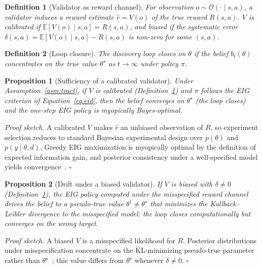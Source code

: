 \documentclass[11pt]{article}
\newtheorem{proposition}{Proposition}
\newtheorem{definition}{Definition}
\begin{document}
\begin{definition}[Validator as reward channel]
\label{def:channel}
For observation $o \sim \mathcal{O}(\cdot \mid s,a)$, a validator induces a reward estimate $\hat{r} = V(o)$ of the true reward $R(s,a)$. $V$ is \emph{calibrated} if $\mathbb{E}[V(o) \mid s,a] = R(s,a)$, and \emph{biased} if the systematic error $\delta(s,a) = \mathbb{E}[V(o) \mid s,a] - R(s,a)$ is non-zero for some $(s,a)$.
\end{definition}

\begin{definition}[Loop closure]
\label{def:closure}
The discovery loop \emph{closes} on $\theta$ if the belief $b_t(\theta)$ concentrates on the true value $\theta^\star$ as $t \to \infty$ under policy $\pi$.
\end{definition}

\begin{proposition}[Sufficiency of a calibrated validator]
\label{prop:suff}
Under Assumption~\ref{asm:tract}, if $V$ is calibrated (Definition~\ref{def:channel}) and $\pi$ follows the EIG criterion of Equation~\ref{eq:eid}, then the belief converges on $\theta^\star$ (the loop closes) and the one-step EIG policy is myopically Bayes-optimal.
\end{proposition}

\noindent\emph{Proof sketch.} A calibrated $V$ makes $\hat{r}$ an unbiased observation of $R$, so experiment selection reduces to standard Bayesian experimental design over $p(\theta)$ and $p(y \mid \theta, d)$. Greedy EIG maximization is myopically optimal by the definition of expected information gain, and posterior consistency under a well-specified model yields convergence~\citep{rainforth2024modern,foster2019variational}. $\square$

\begin{proposition}[Drift under a biased validator]
\label{prop:drift}
If $V$ is biased with $\delta \neq 0$ (Definition~\ref{def:channel}), the EIG policy computed under the misspecified reward channel drives the belief to a pseudo-true value $\theta^\dagger \neq \theta^\star$ that minimizes the Kullback--Leibler divergence to the misspecified model: the loop closes computationally but converges on the wrong target.
\end{proposition}

\noindent\emph{Proof sketch.} A biased $V$ is a misspecified likelihood for $R$. Posterior distributions under misspecification concentrate on the KL-minimizing pseudo-true parameter rather than $\theta^\star$~\citep{berk1966}; this value differs from $\theta^\star$ whenever $\delta \neq 0$. $\square$
\end{document}
